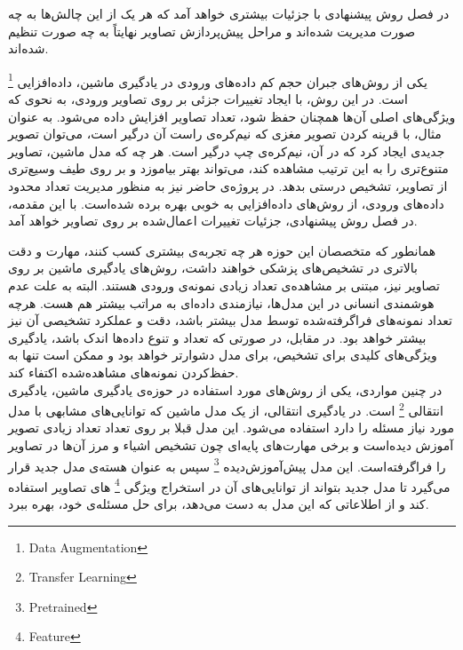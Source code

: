 در فصل روش پیشنهادی با جزئیات بیشتری خواهد آمد که هر یک از این چالش‌ها به چه صورت مدیریت شده‌اند و مراحل پیش‌پردازش تصاویر نهایتاً به چه صورت تنظیم شده‌اند.





یکی از روش‌های جبران حجم کم داده‌های ورودی در یادگیری ماشین، داده‌افزایی
\footnote{Data Augmentation}
 است.
در این روش، با ایجاد تغییرات جزئی بر روی تصاویر ورودی، به نحوی که ویژگی‌های اصلی آن‌ها همچنان حفظ شود، تعداد تصاویر افزایش داده می‌شود.
به عنوان مثال، با قرینه کردن تصویر مغزی که نیم‌کره‌ی راست آن درگیر است، می‌‌توان تصویر جدیدی ایجاد کرد که در آن، نیم‌کره‌ی چپ درگیر است.
هر چه که مدل ماشین، تصاویر متنوع‌تری را به این ترتیب مشاهده کند، می‌تواند بهتر بیاموزد و بر روی طیف وسیع‌تری از تصاویر، تشخیص درستی بدهد.
در پروژه‌ی حاضر نیز به منظور مدیریت تعداد محدود داده‌های ورودی، از روش‌های داده‌افزایی به خوبی بهره برده شده‌است.
با این مقدمه، در فصل روش پیشنهادی، جزئیات تغییرات اعمال‌شده بر روی تصاویر خواهد آمد.


همانطور که متخصصان این حوزه هر چه تجربه‌ی بیشتری کسب کنند، مهارت و دقت بالاتری در تشخیص‌های پزشکی خواهند داشت،
روش‌های یادگیری ماشین بر روی تصاویر نیز، مبتنی بر مشاهده‌ی تعداد زیادی نمونه‌ی ورودی هستند.
البته به علت عدم هوشمندی انسانی در این مدل‌ها، نیازمندی داده‌ای به مراتب بیشتر هم هست.
هرچه تعداد نمونه‌های فراگرفته‌شده توسط مدل بیشتر باشد، دقت و عملکرد تشخیصی آن نیز بیشتر خواهد بود.
در مقابل، در صورتی که تعداد و تنوع داده‌ها اندک باشد، یادگیری ویژگی‌های کلیدی برای تشخیص، برای مدل دشوارتر خواهد بود و ممکن است تنها به حفظ‌کردن نمونه‌های مشاهده‌شده اکتفاء کند.\\

در چنین مواردی، یکی از روش‌های مورد استفاده در حوزه‌ی یادگیری ماشین، یادگیری انتقالی
\footnote{Transfer Learning}
 است.
در یادگیری انتقالی، از یک مدل ماشین که توانایی‌های مشابهی با مدل مورد نیاز مسئله را دارد
استفاده می‌شود.
این مدل قبلا بر روی تعداد تعداد زیادی تصویر آموزش دیده‌است و برخی مهارت‌های پایه‌ای چون تشخیص اشیاء و مرز آن‌ها در تصاویر را فراگرفته‌است.
این مدل پیش‌آموزش‌دیده
\footnote{Pretrained}
سپس
به عنوان هسته‌ی مدل جدید قرار می‌گیرد تا مدل جدید بتواند از توانایی‌های آن در استخراج ویژگی
\footnote{Feature}
های تصاویر استفاده کند 
و از اطلاعاتی که این مدل به دست می‌دهد، برای حل مسئله‌ی خود، بهره ببرد.\\


